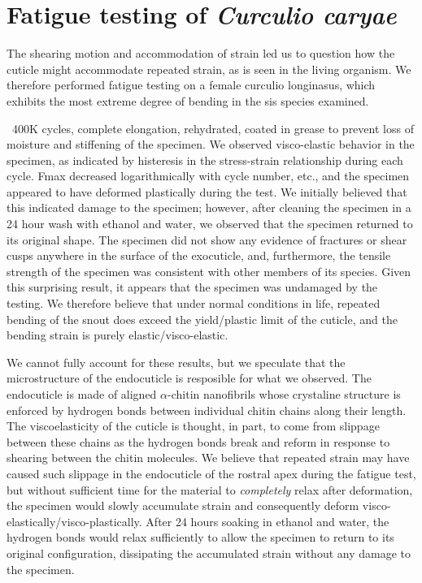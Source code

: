 \documentclass[twocolumn, linenumbers, superscriptaddress]{revtex4-1}
\begin{document}
	\section{Fatigue testing of \textit{Curculio caryae}} %
		The shearing motion and accommodation of strain led us to question how the cuticle might accommodate repeated strain, as is seen in the living organism.
		We therefore performed fatigue testing on a female curculio longinasus, which exhibits the most extreme degree of bending in the sis species examined.
			
		~400K cycles, complete elongation, rehydrated, coated in grease to prevent loss of moisture and stiffening of the specimen.
		We observed visco-elastic behavior in the specimen, as indicated by histeresis in the stress-strain relationship during each cycle.
		Fmax decreased logarithmically with cycle number, etc., and the specimen appeared to have deformed plastically during the test.
		We initially believed that this indicated damage to the specimen; however, after cleaning the specimen in a 24 hour wash with ethanol and water, we observed that the specimen returned to its original shape.
		The specimen did not show any evidence of fractures or shear cusps anywhere in the surface of the exocuticle, and, furthermore, the tensile strength of the specimen was consistent with other members of its species.
		Given this surprising result, it appears that the specimen was undamaged by the testing.
		We therefore believe that under normal conditions in life, repeated bending of the snout does exceed the yield/plastic limit of the cuticle, and the bending strain is purely elastic/visco-elastic.
		
		We cannot fully account for these results, but we speculate that the microstructure of the endocuticle is resposible for what we observed.
		The endocuticle is made of aligned $\alpha$-chitin nanofibrils whose crystaline structure is enforced by hydrogen bonds between individual chitin chains along their length.
		The viscoelasticity of the cuticle is thought, in part, to come from slippage between these chains as the hydrogen bonds break and reform in response to shearing between the chitin molecules.
		We believe that repeated strain may have caused such slippage in the endocuticle of the rostral apex during the fatigue test, but without sufficient time for the material to \textit{completely} relax after deformation, the specimen would slowly accumulate strain and consequently deform visco-elastically/visco-plastically.
		After 24 hours soaking in ethanol and water, the hydrogen bonds would relax sufficiently to allow the specimen to return to its original configuration, dissipating the accumulated strain without any damage to the specimen.
\end{document}
